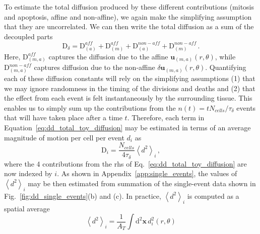 \documentclass[
reprint
,aps
,amssymb
,amsmath
,superscriptaddress
]{revtex4-1}
\begin{document}
To estimate the total diffusion produced by these different contributions  (mitosis and apoptosis, affine and non-affine), we again make the simplifying assumption that they are uncorrelated. We can then write the total diffusion as a sum of the decoupled parts
%
\begin{equation}\label{eq:dd_total_toy_diffusion}
\mathrm{D}_{\delta} = \mathrm{D}^{aff}_{(a)} + \mathrm{D}^{aff}_{(m)} + \mathrm{D}^{non-aff}_{(a)} + \mathrm{D}^{non-aff}_{(m)} \, .
\end{equation}
%
Here, $\mathrm{D}^{aff}_{(m,a)}$ captures the diffusion due to the affine $\mathbf{u}_{(m,a)}(r, \theta)$, while $\mathrm{D}^{non-aff}_{(m,a)}$ captures diffusion due to the non-affine $\delta \mathbf{u}_{(m,a)}(r, \theta)$. Quantifying each of these diffusion constants will rely on the simplifying assumptions (1) that we may ignore randomness in the timing of the divisions and deaths and (2) that the effect from each event is felt instantaneously by the surrounding tissue. This enables us to simply sum up the contributions from the $n(t) = t N_{cells} / \tau_\delta$ events that will have taken place after a time $t$. Therefore, each term in Equation~\ref{eq:dd_total_toy_diffusion} may be estimated in terms of an average magnitude of motion per cell per event $d_i$ as
%
\begin{equation}\label{eq:dd_motion_estimater}
\mathrm{D}_i = \frac{N_{cells}}{4 \tau_\delta} \left\langle d^2\right\rangle_i \, ,
\end{equation}
%
where the 4 contributions from the rhs of Eq.~\ref{eq:dd_total_toy_diffusion} are now indexed by $i$. As shown in Appendix~\ref{app:single_events}, the values of $\left\langle d^2 \right\rangle_i$ may be then estimated from summation of the single-event data shown in Fig.~\ref{fig:dd_single_events}(b) and (c). In practice, $\left \langle d^2 \right\rangle_i$ is computed as a spatial average
%
\begin{equation}\label{eq:dd_displacement_averaging}
\left \langle d^2 \right\rangle_i =\frac{1}{A_T} \int \mathrm{d}^2 \mathbf{x} \, d^2_i(r, \theta)
\end{equation}
%
\end{document}
